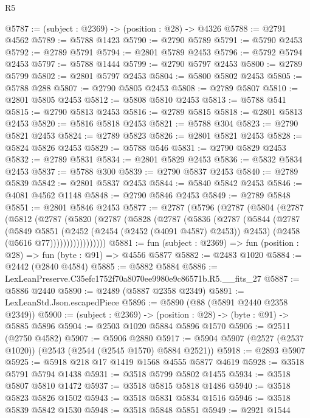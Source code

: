 \begin{lexlean}{R5}
\begin{coremodule}
@5787 := (subject : @2369) -> (position : @28) -> @4326
@5788 := @2791 @4562
@5789 := @5788 @1423
@5790 := @2790 @5789
@5791 := @5790 @2453
@5792 := @2789 @5791
@5794 := @2801 @5789 @2453
@5796 := @5792 @5794 @2453
@5797 := @5788 @1444
@5799 := @2790 @5797 @2453
@5800 := @2789 @5799
@5802 := @2801 @5797 @2453
@5804 := @5800 @5802 @2453
@5805 := @5788 @288
@5807 := @2790 @5805 @2453
@5808 := @2789 @5807
@5810 := @2801 @5805 @2453
@5812 := @5808 @5810 @2453
@5813 := @5788 @541
@5815 := @2790 @5813 @2453
@5816 := @2789 @5815
@5818 := @2801 @5813 @2453
@5820 := @5816 @5818 @2453
@5821 := @5788 @304
@5823 := @2790 @5821 @2453
@5824 := @2789 @5823
@5826 := @2801 @5821 @2453
@5828 := @5824 @5826 @2453
@5829 := @5788 @546
@5831 := @2790 @5829 @2453
@5832 := @2789 @5831
@5834 := @2801 @5829 @2453
@5836 := @5832 @5834 @2453
@5837 := @5788 @300
@5839 := @2790 @5837 @2453
@5840 := @2789 @5839
@5842 := @2801 @5837 @2453
@5844 := @5840 @5842 @2453
@5846 := @4081 @4562 @1148
@5848 := @2790 @5846 @2453
@5849 := @2789 @5848
@5851 := @2801 @5846 @2453
@5877 := @2787
    (@5796
      (@2787
        (@5804
          (@2787
            (@5812
              (@2787
                (@5820
                  (@2787
                    (@5828
                      (@2787
                        (@5836
                          (@2787
                            (@5844
                              (@2787
                                (@5849
                                  @5851
                                  (@2452 (@2454 (@2452 (@4091 @4587) @2453)) @2453)
                                  (@2458 (@5616 @77)))))))))))))))))
@5881 := fun (subject : @2369) => fun (position : @28) => fun (byte : @91) => @4556 @5877
@5882 := @2483 @1020
@5884 := @2442 (@2840 @4584)
@5885 := @5882 @5884
@5886 := LexLeanPreserve.C35efc1752f70a8070ee9980e9c86571b.R5.__fits_27
@5887 := @5886 @2440
@5890 := @2489 (@5887 @2358 @2349)
@5891 := LexLeanStd.Json.escapedPiece
@5896 := @5890 (@88 (@5891 @2440 @2358 @2349))
@5900 := (subject : @2369) -> (position : @28) -> (byte : @91) -> @5885 @5896
@5904 := @2503 @1020 @5884 @5896 @1570
@5906 := @2511 (@2750 @4582)
@5907 := @5906 @2880
@5917 := @5904 @5907 (@2527 (@2537 @1020)) (@2543 (@2544 (@2545 @1570) @5884 @2521))
@5918 := @2893 @5907
@5925 := @5918 @218 @17 @1419 @1568 @4555 @5877 @4619
@5928 := @3518 @5791 @5794 @1438
@5931 := @3518 @5799 @5802 @1455
@5934 := @3518 @5807 @5810 @1472
@5937 := @3518 @5815 @5818 @1486
@5940 := @3518 @5823 @5826 @1502
@5943 := @3518 @5831 @5834 @1516
@5946 := @3518 @5839 @5842 @1530
@5948 := @3518 @5848 @5851
@5949 := @2921 @1544

\end{coremodule}
\end{lexlean}
